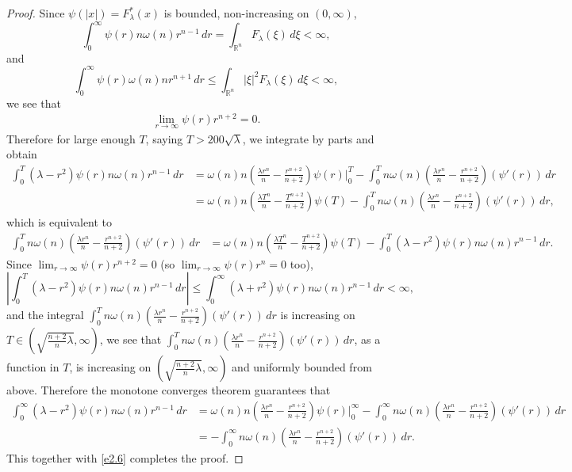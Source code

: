 \documentclass[11pt,twoside, leqno]{article}
\def\rr{{\mathbb R}}
\def\rn{{{\rr}^n}}
\numberwithin{equation}{section}
\begin{document}
\begin{proof}
Since $\psi(|x|)=F_\lambda^\ast(x)$ is bounded, non-increasing on $(0,\infty)$,
$$\int_{0}^\infty\psi(r)n\omega(n)r^{n-1}\,dr=\int_{\rn}F_\lambda(\xi)\,d\xi<\infty,$$
and
$$\int_{0}^\infty\psi(r) \omega(n){n} r^{n+1}\,dr\le \int_{\rn}|\xi|^2F_\lambda(\xi)\,d\xi<\infty,$$
we see that
\begin{align*}
\lim_{r\to\infty} \psi(r)r^{n+2}= 0.
\end{align*}
Therefore for large enough $T$, saying $T>200\sqrt\lambda$,  we integrate by parts and obtain
\begin{align*}
\int_{0}^T(\lambda-r^2)\psi(r)n\omega(n)r^{n-1}\,dr&= {\omega(n)}{n}\left(\frac{\lambda r^n}{n}-\frac{r^{n+2}}{n+2}\right) \psi(r)\bigg|_{0}^{T}- \int_0^T n\omega(n)\left(\frac{\lambda r^n}{n} -\frac{r^{n+2}}{n+2}\right) (\psi'(r))\,dr\\
&= {\omega(n)}{n}\left(\frac{\lambda T^n}{n}-\frac{T^{n+2}}{n+2}\right) \psi(T)- \int_0^T n\omega(n)\left(\frac{\lambda r^n}{n} -\frac{r^{n+2}}{n+2}\right) (\psi'(r))\,dr,
\end{align*}
which is equivalent to
\begin{align*}
\int_0^T n\omega(n)\left(\frac{\lambda r^n}{n} -\frac{r^{n+2}}{n+2}\right) (\psi'(r))\,dr&={\omega(n)}{n}\left(\frac{\lambda T^n}{n}-\frac{T^{n+2}}{n+2}\right) \psi(T)-\int_{0}^T(\lambda-r^2)\psi(r)n\omega(n)r^{n-1}\,dr.
\end{align*}
Since $\lim_{r\to\infty} \psi(r)r^{n+2}= 0$ (so $\lim_{r\to\infty} \psi(r)r^{n}=0$ too),
$$\left |\int_{0}^T(\lambda-r^2)\psi(r)n\omega(n)r^{n-1}\,dr \right|\le \int_{0}^\infty(\lambda+r^2)\psi(r)n\omega(n)r^{n-1}\,dr  <\infty,$$
and the integral $\int_0^T n\omega(n)\left(\frac{\lambda r^n}{n} -\frac{r^{n+2}}{n+2}\right) (\psi'(r))\,dr$ is increasing on $T\in (\sqrt{\frac{n+2}{n}\lambda},\infty)$,
we see that $\int_0^T n\omega(n)\left(\frac{\lambda r^n}{n} -\frac{r^{n+2}}{n+2}\right) (\psi'(r))\,dr$, as a function in $T$, is increasing on $(\sqrt{\frac{n+2}{n}\lambda},\infty)$
and uniformly bounded from above.
Therefore the monotone converges theorem guarantees that
\begin{align*}
\int_{0}^\infty(\lambda-r^2)\psi(r)n\omega(n)r^{n-1}\,dr&= {\omega(n)}{n}\left(\frac{\lambda r^n}{n}-\frac{r^{n+2}}{n+2}\right) \psi(r)\bigg|_{0}^{\infty}- \int_0^\infty n\omega(n)\left(\frac{\lambda r^n}{n} -\frac{r^{n+2}}{n+2}\right) (\psi'(r))\,dr\\
&=- \int_0^\infty n\omega(n)\left(\frac{\lambda r^n}{n} -\frac{r^{n+2}}{n+2}\right) (\psi'(r))\,dr.
\end{align*}
This together with \eqref{e2.6} completes the proof.
\end{proof}
\end{document}
